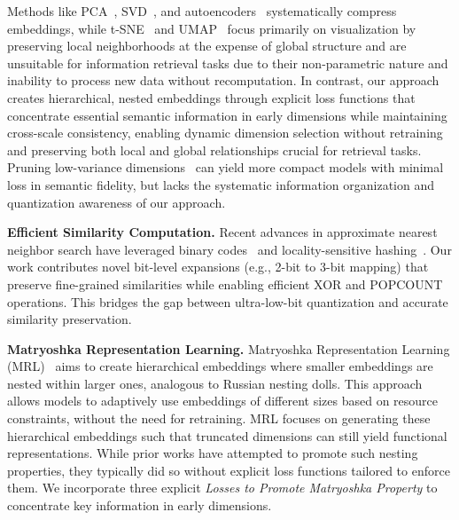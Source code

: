 Methods like PCA~\cite{jolliffe2016principal}, SVD~\cite{golub1971singular}, and autoencoders~\cite{hinton2006reducing} systematically compress embeddings, while t-SNE~\cite{maaten2008visualizing} and UMAP~\cite{mcinnes2018umap} focus primarily on visualization by preserving local neighborhoods at the expense of global structure and are unsuitable for information retrieval tasks due to their non-parametric nature and inability to process new data without recomputation.
In contrast, our approach creates hierarchical, nested embeddings through explicit loss functions that concentrate essential semantic information in early dimensions while maintaining cross-scale consistency, enabling dynamic dimension selection without retraining and preserving both local and global relationships crucial for retrieval tasks. 
Pruning low-variance dimensions~\cite{li2016pruning} can yield more compact models with minimal loss in semantic fidelity, but lacks the systematic information organization and quantization awareness of our approach.

\textbf{Efficient Similarity Computation.}
Recent advances in approximate nearest neighbor search have leveraged binary codes~\cite{wang2017survey} and locality-sensitive hashing~\cite{andoni2006near, andoni2014beyond}. 
Our work contributes novel bit-level expansions (e.g., 2-bit to 3-bit mapping) that preserve fine-grained similarities while enabling efficient XOR and POPCOUNT operations. 
This bridges the gap between ultra-low-bit quantization and accurate similarity preservation.

\textbf{Matryoshka Representation Learning.}
Matryoshka Representation Learning (MRL)~\cite{kusupati2021matryoshka} aims to create hierarchical embeddings where smaller embeddings are nested within larger ones, analogous to Russian nesting dolls. 
This approach allows models to adaptively use embeddings of different sizes based on resource constraints, without the need for retraining. 
MRL focuses on generating these hierarchical embeddings such that truncated dimensions can still yield functional representations. 
While prior works have attempted to promote such nesting properties, they typically did so without explicit loss functions tailored to enforce them.
We incorporate three explicit \emph{Losses to Promote Matryoshka Property} to concentrate key information in early dimensions. 

